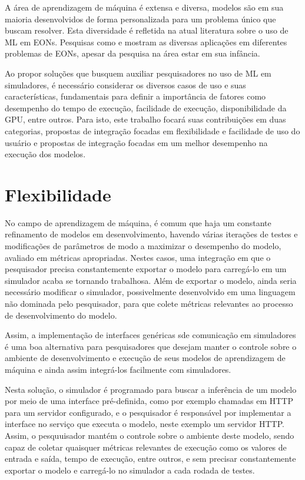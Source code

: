 A área de aprendizagem de máquina é extensa e diversa, modelos são em sua maioria desenvolvidos de forma personalizada para um problema único que buscam resolver. Esta diversidade é refletida na atual literatura sobre o uso de ML em EONs. Pesquisas como \cite{eon_ml_survey_2020} e \cite{8527529} mostram as diversas aplicações em diferentes problemas de EONs, apesar da pesquisa na área estar em sua infância.

Ao propor soluções que busquem auxiliar pesquisadores no uso de ML em simuladores, é necessário considerar os diversos casos de uso e suas características, fundamentais para definir a importância de fatores como desempenho do tempo de execução, facilidade de execução, disponibilidade da GPU, entre outros. Para isto, este trabalho focará suas contribuições em duas categorias, propostas de integração focadas em flexibilidade e facilidade de uso do usuário e propostas de integração focadas em um melhor desempenho na execução dos modelos.

\section{Flexibilidade}

No campo de aprendizagem de máquina, é comum que haja um constante refinamento de modelos em desenvolvimento, havendo várias iterações de testes e modificações de parâmetros de modo a maximizar o desempenho do modelo, avaliado em métricas apropriadas. Nestes casos, uma integração em que o pesquisador precisa constantemente exportar o modelo para carregá-lo em um simulador acaba se tornando trabalhosa. Além de exportar o modelo, ainda seria necessário modificar o simulador, possivelmente desenvolvido em uma linguagem não dominada pelo pesquisador, para que colete métricas relevantes ao processo de desenvolvimento do modelo.

Assim, a implementação de interfaces genéricas sde comunicação em simuladores é uma boa alternativa para pesquisadores que desejam manter o controle sobre o ambiente de desenvolvimento e execução de seus modelos de aprendizagem de máquina e ainda assim integrá-los facilmente com simuladores.

Nesta solução, o simulador é programado para buscar a inferência de um modelo por meio de uma interface pré-definida, como por exemplo chamadas em HTTP para um servidor configurado, e o pesquisador é responsável por implementar a interface no serviço que executa o modelo, neste exemplo um servidor HTTP. Assim, o pesquuisador mantém o controle sobre o ambiente deste modelo, sendo capaz de coletar quaisquer métricas relevantes de execução como os valores de entrada e saída, tempo de execução, entre outros, e sem precisar constantemente exportar o modelo e carregá-lo no simulador a cada rodada de testes.

